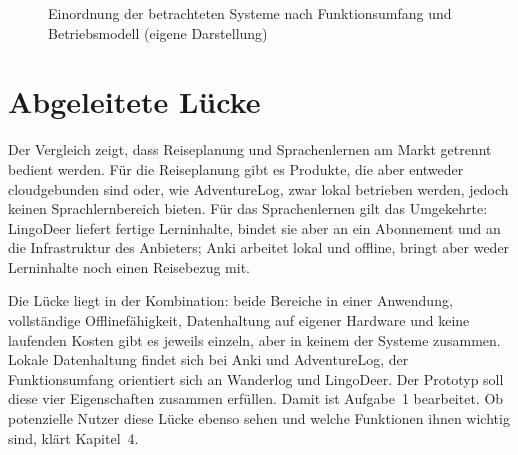 \documentclass[12pt,a4paper]{scrreprt}
\begin{document}
\begin{figure}[!htb]
    \centering
    \caption{Einordnung der betrachteten Systeme nach Funktionsumfang und Betriebsmodell (eigene Darstellung)}
    \label{fig:luecke}
\end{figure}

\section{Abgeleitete Lücke}
Der Vergleich zeigt, dass Reiseplanung und Sprachenlernen am Markt getrennt bedient werden. Für die Reiseplanung gibt es Produkte, die aber entweder cloudgebunden sind oder, wie AdventureLog, zwar lokal betrieben werden, jedoch keinen Sprachlernbereich bieten. Für das Sprachenlernen gilt das Umgekehrte: LingoDeer liefert fertige Lerninhalte, bindet sie aber an ein Abonnement und an die Infrastruktur des Anbieters; Anki arbeitet lokal und offline, bringt aber weder Lerninhalte noch einen Reisebezug mit.

Die Lücke liegt in der Kombination: beide Bereiche in einer Anwendung, vollständige Offlinefähigkeit, Datenhaltung auf eigener Hardware und keine laufenden Kosten gibt es jeweils einzeln, aber in keinem der Systeme zusammen. Lokale Datenhaltung findet sich bei Anki und AdventureLog, der Funktionsumfang orientiert sich an Wanderlog und LingoDeer. Der Prototyp soll diese vier Eigenschaften zusammen erfüllen. Damit ist Aufgabe~1 bearbeitet. Ob potenzielle Nutzer diese Lücke ebenso sehen und welche Funktionen ihnen wichtig sind, klärt Kapitel~4.
\end{document}
